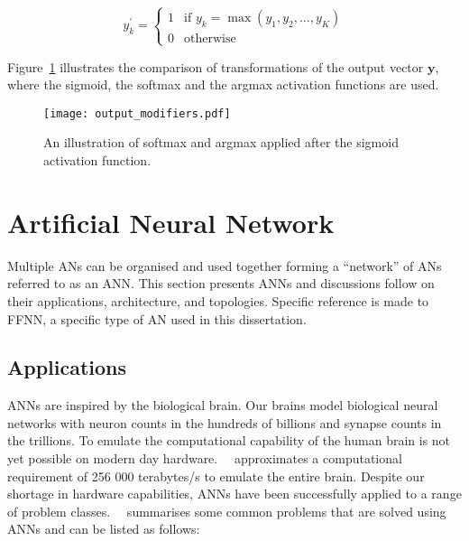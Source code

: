 \begin{equation}
      y^{'}_k =
      \begin{cases}
            1 & \text{if $y_k = \max(y_1, y_2, \dots, y_K)$} \\
            0 & \text{otherwise}
            \label{eq:argmax}
      \end{cases}
\end{equation}

Figure~\ref{fig:anns:activation_functions:softmax_argmax} illustrates the comparison of transformations of the output vector $\boldsymbol{y}$, where the sigmoid, the softmax and the argmax activation functions are used.


\begin{figure}[htb]
      \centering
      \texttt{[image: output\_modifiers.pdf]}
      \caption[The results of softmax and argmax]{An illustration of softmax and argmax applied after the sigmoid activation function.}
      \label{fig:anns:activation_functions:softmax_argmax}
\end{figure}


\section{Artificial Neural Network} \label{sec:anns:ann}

Multiple \acp{AN} can be organised and used together forming a ``network'' of \acp{AN} referred to as an \acf{ANN}. This section presents \acp{ANN} and discussions follow on their applications, architecture, and topologies. Specific reference is made to \acf{FFNN}, a specific type of \acs{AN} used in this dissertation.

\subsection{Applications} \label{sec:anns:anns:applications}

\acp{ANN} are inspired by the biological brain. Our brains model biological neural networks with neuron counts in the hundreds of billions and synapse counts in the trillions. To emulate the computational capability of the human brain is not yet possible on modern day hardware.~\citeauthor{ref:sandberg:2008}~\cite{ref:sandberg:2008} approximates a computational requirement of 256 000 terabytes/s to emulate the entire brain. Despite our shortage in hardware capabilities, \acp{ANN} have been successfully applied to a range of problem classes.~\citeauthor{ref:engelbrecht:2007}~\cite{ref:engelbrecht:2007} summarises some common problems that are solved using \acp{ANN} and can be listed as follows:

